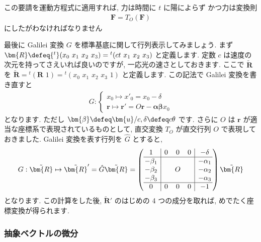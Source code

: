\documentclass[openany, a4paper, oneside]{jsbook}
\begin{document}
この要請を運動方程式に適用すれば, 力は時間に $t$ に陽によらず
かつ力は変換則
\begin{gather}
    \bm{F}
    =
    T_O ( \bm{F} )
\end{gather}
にしたがわなければなりません

最後に Galilei 変換 $G$ を標準基底に関して行列表示してみましょう.
まず
 $\bm{R} \defeq {^t} (x_0 \,\, x_1 \,\, x_2  \,\, x_3 ) = {^t} (ct \,\, x_1 \,\, x_2  \,\, x_3 )$
と定義します.
定数 $c$ は速度の次元を持ってさえいれば良いのですが, 一応光の速さとしておきます.
ここで $\tilde{ \bm{R} }$ を
 $\tilde{ \bm{R} } = {^t} ( \bm{R} \,\, 1 ) = {^t}(x_0 \,\, x_1 \,\, x_2 \,\, x_3 \,\, 1 )$ と定義します.
この記法で Galilei 変換を書き直すと
\begin{gather}
 G:
 \begin{cases}
  x_0 \mapsto x'_0 = x_0 - \delta \\
  \bm{r} \mapsto \bm{r}' = O \bm{r} - \bm{\alpha} \bm{\beta} x_0
 \end{cases}
\end{gather}
となります. ただし $\bm{\beta} \defeq \bm{u} / c , \delta \defeq c \theta$ です.
さらに $O$ は $\bm{r}$ が適当な座標系で表現されているものとして,
直交変換 $T_O$ が直交行列 $O$ で表現しておきました.
Galilei 変換を表す行列を $\hat{G}$ とすると,
\begin{gather}
    G:
    \tilde{ \bm{R} }
    \mapsto
    \tilde{ \bm{R} }'
    =
    \hat{G} \tilde{ \bm{R} }
    =
    \left (
        \begin{array}{@{\,}c|ccc|c@{\,}}
            1 & 0 & 0 & 0 & -\delta \\ \hline
            -\beta_1 & & & & -\alpha_1 \\
            -\beta_2 & & O & & -\alpha_2 \\
            -\beta_3 & & & & -\alpha_3 \\ \hline
            0 & 0 & 0 & 0 & -1 \\
        \end{array}
    \right)
    \tilde{ \bm{R} }
\end{gather}
となります.
この計算をした後,  $\tilde{ \bm{R} }'$ のはじめの 4 つの成分を取れば,
めでたく座標変換が得られます.
\subsubsection{抽象ベクトルの微分}
\end{document}
